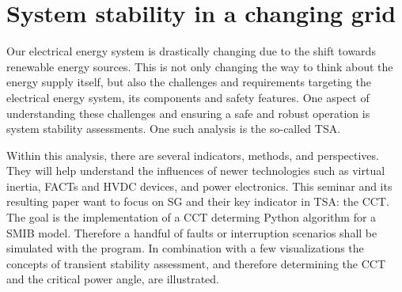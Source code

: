
\chapter{System stability in a changing grid}
\label{chap:intro}

Our electrical energy system is drastically changing due to the shift towards renewable energy sources. This is not only changing the way to think about the energy supply itself, but also the challenges and requirements targeting the electrical energy system, its components and safety features. One aspect of understanding these challenges and ensuring a safe and robust operation is system stability assessments. One such analysis is the so-called \acf{TSA}. \autocite{vdeverbandderelektrotechnikelektronikinformationstechnike.v.PerspektivenElektrischenEnergieubertragung2019}

Within this analysis, there are several indicators, methods, and perspectives. They will help understand the influences of newer technologies such as virtual inertia, FACTs and HVDC devices, and power electronics. This seminar and its resulting paper want to focus on \acf{SG} and their key indicator in \acs{TSA}: the \acf{CCT}. \autocite{gloverPowerSystemAnalysis2017,kundurPowerSystemStability2022,machowskiPowerSystemDynamics2020,oedingElektrischeKraftwerkeUnd2016,schwabElektroenergiesystemeSmarteStromversorgung2022} The goal is the implementation of a \ac{CCT} determing Python algorithm for a \ac{SMIB} model. Therefore a handful of faults or interruption scenarios shall be simulated with the program. In combination with a few visualizations the concepts of transient stability assessment, and therefore determining the \ac{CCT} and the critical power angle, are illustrated.

%     
